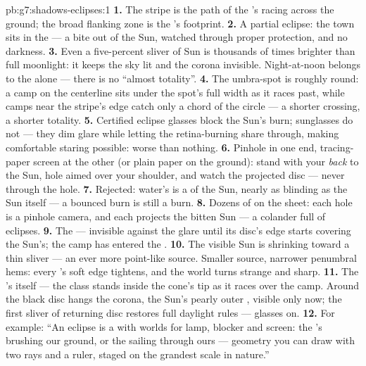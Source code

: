 \begin{solution}{pb:g7:shadows-eclipses:1}
\textbf{1.} The stripe is the path of the 's  racing
across the ground; the broad flanking zone is the 's
footprint.
\textbf{2.} A partial eclipse: the town sits in the  ---
a bite out of the Sun, watched through proper protection, and no
darkness.
\textbf{3.} Even a five-percent sliver of Sun is thousands of
times brighter than full moonlight: it keeps the sky lit and the
corona invisible. Night-at-noon belongs to the  alone ---
there is no ``almost totality''.
\textbf{4.} The umbra-spot is roughly round: a camp on the
centerline sits under the spot's full width as it races past,
while camps near the stripe's edge catch only a chord of the
circle --- a shorter crossing, a shorter totality.
\textbf{5.} Certified eclipse glasses block the Sun's burn;
sunglasses do not --- they dim glare while letting the
retina-burning share through, making comfortable staring
possible: worse than nothing.
\textbf{6.} Pinhole in one end, tracing-paper screen at the
other (or plain paper on the ground): stand with your \emph{back}
to the Sun, hole aimed over your shoulder, and watch the
projected disc --- never through the hole.
\textbf{7.} Rejected: water's  is a  of
the Sun, nearly as blinding as the Sun itself --- a bounced burn
is still a burn.
\textbf{8.} Dozens of   on the sheet: each hole is
a pinhole camera, and each projects the bitten Sun --- a colander
full of eclipses.
\textbf{9.} The  --- invisible against the glare until its
disc's edge starts covering the Sun's; the camp has entered the
.
\textbf{10.} The visible Sun is shrinking toward a thin sliver
--- an ever more point-like source. Smaller source, narrower
penumbral hems: every 's soft edge tightens, and the world
turns strange and sharp.
\textbf{11.} The 's  itself --- the class stands inside
the  cone's tip as it races over the camp. Around the
black disc hangs the corona, the Sun's pearly outer ,
visible only now; the first sliver of returning disc restores
full daylight rules --- glasses on.
\textbf{12.} For example: ``An eclipse is a  with worlds
for lamp, blocker and screen: the 's  brushing our
ground, or the  sailing through ours --- geometry you can
draw with two rays and a ruler, staged on the grandest scale in
nature.''
\end{solution}
